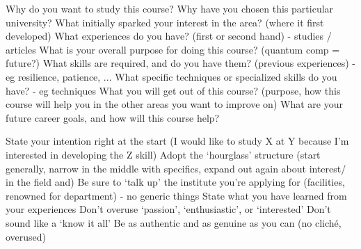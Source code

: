 \documentclass[11pt]{article}
\newcommand*{\NEWLINE}{\vspace{0.75em}}
\begin{document}
Why do you want to study this course?
Why have you chosen this particular university?
What initially sparked your interest in the area? (where it first developed)
What experiences do you have? (first or second hand) - studies / articles
What is your overall purpose for doing this course? (quantum comp = future?)
What skills are required, and do you have them? (previous experiences) - eg resilience, patience, ...
What specific techniques or specialized skills do you have? - eg techniques
What you will get out of this course? (purpose, how this course will help you in the other areas you want to improve on)
What are your future career goals, and how will this course help?
\NEWLINE{}

State your intention right at the start (I would like to study X at Y because I’m interested in developing the Z skill)
Adopt the ‘hourglass’ structure (start generally, narrow in the middle with specifics, expand out again about interest/ in the field and)
Be sure to ‘talk up’ the institute you’re applying for (facilities, renowned for department) - no generic things
State what you have learned from your experiences
Don’t overuse ‘passion’, ‘enthusiastic’, or ‘interested’
Don’t sound like a ‘know it all’
Be as authentic and as genuine as you can (no cliché, overused)
\NEWLINE{}
\end{document}
